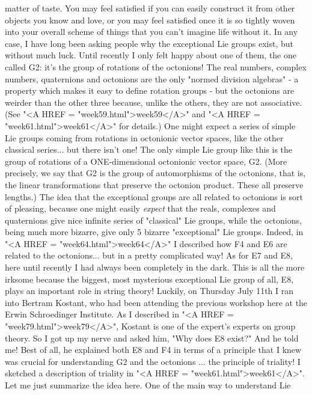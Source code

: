 matter of taste.  You may feel satisfied if you can easily construct
it from other objects you know and love, or you may feel satisfied
once it is so tightly woven into your overall scheme of things that
you can't imagine life without it.  
In any case, I have long been asking people why the exceptional Lie
groups exist, but without much luck.  Until recently I only felt happy
about one of them, the one called G2: it's the group of rotations of
the octonions!  The real numbers, complex numbers, quaternions and
octonions are the only "normed division algebras" - a property which
makes it easy to define rotation groups - but the octonions are
weirder than the other three because, unlike the others, they are not
associative.  (See "<A HREF = "week59.html">week59</A>" and "<A HREF
= "week61.html">week61</A>" for details.)  One might
expect a series of simple Lie groups coming from rotations in
octonionic vector spaces, like the other classical series... but there
isn't one!  The only simple Lie group like this is the group of
rotations of a ONE-dimensional octonionic vector space, G2.
(More precisely, we say that G2 is the group of automorphisms
of the octonions, that is, the linear transformations that preserve
the octonion product.  These all preserve lengths.)
The idea that the exceptional groups are all related to octonions
is sort of pleasing, because one might easily \emph{expect} that the
reals, complexes and quaternions give nice infinite series of
"classical" Lie groups, while the octonions, being much more bizarre,
give only 5 bizarre "exceptional" Lie groups.  Indeed, in "<A HREF = 
"week64.html">week64</A>"
I described how F4 and E6 are related to the octonions... but in a 
pretty complicated way!  As for E7 and E8, here until recently I had 
always been completely in the dark.  This is all the more irksome 
because the biggest, most mysterious exceptional Lie group of
all, E8, plays an important role in string theory!
Luckily, on Thursday July 11th I ran into Bertram Kostant, who had
been attending the previous workshop here at the Erwin Schroedinger
Institute.  As I described in "<A HREF = "week79.html">week79</A>", Kostant is one of the expert's
experts on group theory.  So I got up my nerve and asked him, "Why
does E8 exist?"  And he told me!  Best of all, he explained both E8
and F4 in terms of a principle that I knew was crucial for
understanding G2 and the octonions ... the principle of triality!
I sketched a description of triality in "<A HREF = "week61.html">week61</A>".  
Let me just
summarize the idea here.  One of the main way to understand Lie
